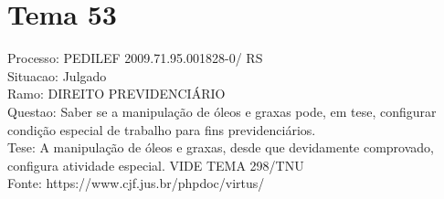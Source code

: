 \documentclass[12pt]{article}
\begin{document}
\section*{Tema 53}
Processo: PEDILEF 2009.71.95.001828-0/ RS\\
Situacao: Julgado\\
Ramo: DIREITO PREVIDENCIÁRIO\\
Questao: Saber se a manipulação de óleos e graxas pode, em tese, configurar condição especial de trabalho para fins previdenciários.\\
Tese: A manipulação de óleos e graxas, desde que devidamente comprovado, configura atividade especial. VIDE TEMA 298/TNU\\
Fonte: https://www.cjf.jus.br/phpdoc/virtus/
\end{document}
